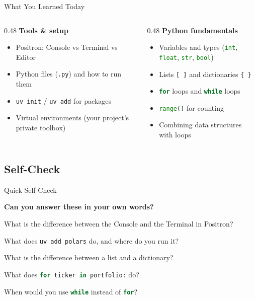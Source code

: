 \documentclass[9pt,aspectratio=169]{beamer}
\newcommand{\py}[1]{\lstinline[language=Python]{#1}}
\begin{document}
\begin{frame}{What You Learned Today}

\begin{columns}[T]
\begin{column}{0.48\textwidth}
\textbf{Tools \& setup}
\begin{itemize}
    \item Positron: Console vs Terminal vs Editor
    \item Python files (\texttt{.py}) and how to run them
    \item \texttt{uv init} / \texttt{uv add} for packages
    \item Virtual environments (your project's private toolbox)
\end{itemize}
\end{column}
\begin{column}{0.48\textwidth}
\textbf{Python fundamentals}
\begin{itemize}
    \item Variables and types (\py{int}, \py{float}, \py{str}, \py{bool})
    \item Lists \texttt{[~]} and dictionaries \texttt{\{~\}}
    \item \py{for} loops and \py{while} loops
    \item \py{range()} for counting
    \item Combining data structures with loops
\end{itemize}
\end{column}
\end{columns}

\end{frame}


\subsection{Self-Check}
\begin{frame}[fragile]{Quick Self-Check}

\textbf{Can you answer these in your own words?}

\be
    \item What is the difference between the Console and the Terminal in Positron?
    \item What does \texttt{uv add polars} do, and where do you run it?
    \item What is the difference between a list and a dictionary?
    \item What does \py{for ticker in portfolio:} do?
    \item When would you use \py{while} instead of \py{for}?
\ee

\end{frame}
\end{document}
